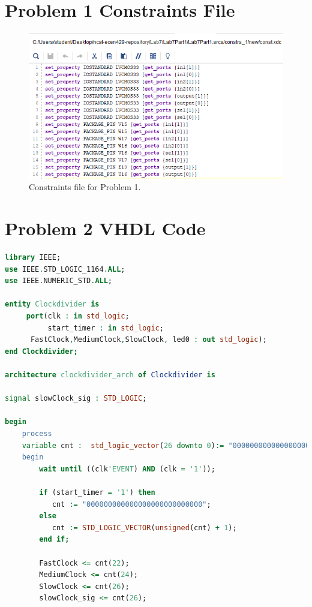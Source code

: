 \documentclass[11pt]{article}
\begin{document}
\begin{appendices}
\section{Problem 1 Constraints File}
\begin{center}
\begin{figure}[H]
	\includegraphics[scale=1]{./images/Lab7Part1Const.png}
	\caption{\label{fig:Prob1Const}Constraints file for Problem 1.}
\end{figure}
\end{center}

\section{Problem 2 VHDL Code}
\begin{lstlisting}[language=VHDL]
library IEEE;
use IEEE.STD_LOGIC_1164.ALL;
use IEEE.NUMERIC_STD.ALL;

entity Clockdivider is
     port(clk : in std_logic;
          start_timer : in std_logic;
	  FastClock,MediumClock,SlowClock, led0 : out std_logic);
end Clockdivider;

architecture clockdivider_arch of Clockdivider is

signal slowClock_sig : STD_LOGIC;

begin
    process  
    variable cnt :	std_logic_vector(26 downto 0):= "000000000000000000000000000";
    begin					 
        wait until ((clk'EVENT) AND (clk = '1'));
	       
		if (start_timer = '1') then
	       cnt := "000000000000000000000000000";
	    else  
           cnt := STD_LOGIC_VECTOR(unsigned(cnt) + 1);
	    end if;

   	    FastClock <= cnt(22);
   	    MediumClock <= cnt(24);	
   	    SlowClock <= cnt(26);
        slowClock_sig <= cnt(26);
	

\end{lstlisting}
\end{appendices}
\end{document}

